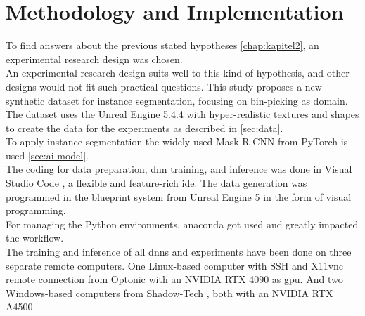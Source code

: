\chapter{Methodology and Implementation}
\label{chap:kapitel3}
	To find answers about the previous stated hypotheses \ref{chap:kapitel2}, an experimental research design was chosen.\\
	An experimental research design suits well to this kind of hypothesis, and other designs would not fit such practical questions. This study proposes a new synthetic dataset for instance segmentation, focusing on bin-picking as domain. The dataset uses the Unreal Engine 5.4.4 \cite{ue5} with hyper-realistic textures and shapes to create the data for the experiments as described in \ref{sec:data}.\\
	To apply instance segmentation the widely used Mask R-CNN \cite{Kaiming2017} from PyTorch \cite{pytorch} is used \ref{sec:ai-model}.\\
	The coding for data preparation, \ac{dnn} training, and inference was done in Visual Studio Code \cite{vscode}, a flexible and feature-rich \ac{ide}. The data generation was programmed in the blueprint system from Unreal Engine 5 \cite{ue5} in the form of visual programming.\\
	For managing the Python environments, anaconda \cite{anaconda} got used and greatly impacted the workflow.\\
	The training and inference of all \ac{dnn}s and experiments have been done on three separate remote computers. One Linux-based computer with SSH and X11vnc remote connection from Optonic \cite{optonic} with an NVIDIA RTX 4090 as \ac{gpu}. And two Windows-based computers from Shadow-Tech \cite{shadow}, both with an NVIDIA RTX A4500.

	
	
	

